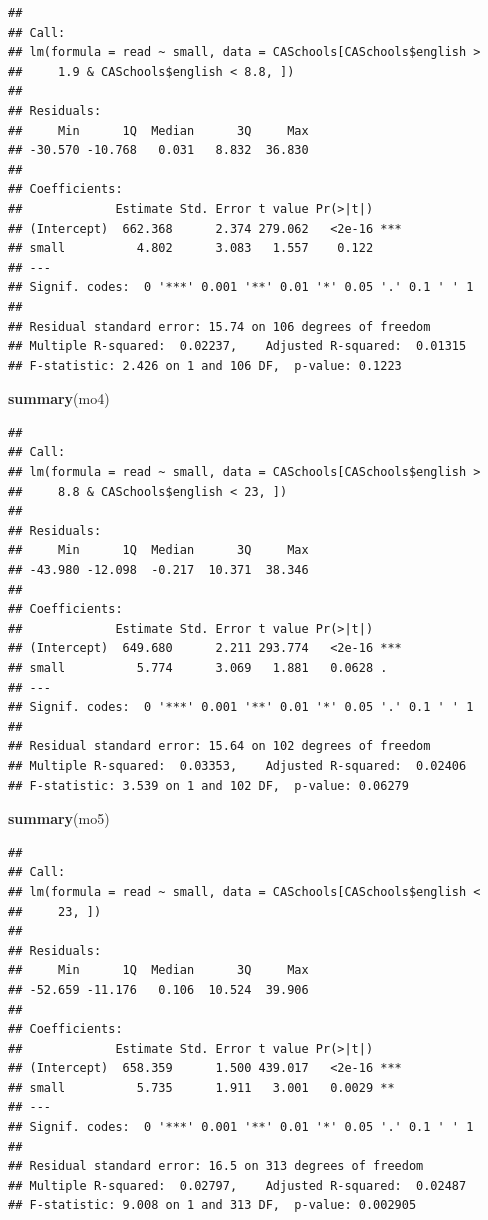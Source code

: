 \documentclass[
]{book}
\newenvironment{Shaded}{\begin{snugshade}}{\end{snugshade}}
\newcommand{\KeywordTok}[1]{\textcolor[rgb]{0.13,0.29,0.53}{\textbf{#1}}}
\newcommand{\NormalTok}[1]{#1}
\begin{document}
\begin{verbatim}
## 
## Call:
## lm(formula = read ~ small, data = CASchools[CASchools$english > 
##     1.9 & CASchools$english < 8.8, ])
## 
## Residuals:
##     Min      1Q  Median      3Q     Max 
## -30.570 -10.768   0.031   8.832  36.830 
## 
## Coefficients:
##             Estimate Std. Error t value Pr(>|t|)    
## (Intercept)  662.368      2.374 279.062   <2e-16 ***
## small          4.802      3.083   1.557    0.122    
## ---
## Signif. codes:  0 '***' 0.001 '**' 0.01 '*' 0.05 '.' 0.1 ' ' 1
## 
## Residual standard error: 15.74 on 106 degrees of freedom
## Multiple R-squared:  0.02237,    Adjusted R-squared:  0.01315 
## F-statistic: 2.426 on 1 and 106 DF,  p-value: 0.1223
\end{verbatim}

\begin{Shaded}
\begin{Highlighting}[]
\KeywordTok{summary}\NormalTok{(mo4)}
\end{Highlighting}
\end{Shaded}

\begin{verbatim}
## 
## Call:
## lm(formula = read ~ small, data = CASchools[CASchools$english > 
##     8.8 & CASchools$english < 23, ])
## 
## Residuals:
##     Min      1Q  Median      3Q     Max 
## -43.980 -12.098  -0.217  10.371  38.346 
## 
## Coefficients:
##             Estimate Std. Error t value Pr(>|t|)    
## (Intercept)  649.680      2.211 293.774   <2e-16 ***
## small          5.774      3.069   1.881   0.0628 .  
## ---
## Signif. codes:  0 '***' 0.001 '**' 0.01 '*' 0.05 '.' 0.1 ' ' 1
## 
## Residual standard error: 15.64 on 102 degrees of freedom
## Multiple R-squared:  0.03353,    Adjusted R-squared:  0.02406 
## F-statistic: 3.539 on 1 and 102 DF,  p-value: 0.06279
\end{verbatim}

\begin{Shaded}
\begin{Highlighting}[]
\KeywordTok{summary}\NormalTok{(mo5)}
\end{Highlighting}
\end{Shaded}

\begin{verbatim}
## 
## Call:
## lm(formula = read ~ small, data = CASchools[CASchools$english < 
##     23, ])
## 
## Residuals:
##     Min      1Q  Median      3Q     Max 
## -52.659 -11.176   0.106  10.524  39.906 
## 
## Coefficients:
##             Estimate Std. Error t value Pr(>|t|)    
## (Intercept)  658.359      1.500 439.017   <2e-16 ***
## small          5.735      1.911   3.001   0.0029 ** 
## ---
## Signif. codes:  0 '***' 0.001 '**' 0.01 '*' 0.05 '.' 0.1 ' ' 1
## 
## Residual standard error: 16.5 on 313 degrees of freedom
## Multiple R-squared:  0.02797,    Adjusted R-squared:  0.02487 
## F-statistic: 9.008 on 1 and 313 DF,  p-value: 0.002905
\end{verbatim}
\end{document}
